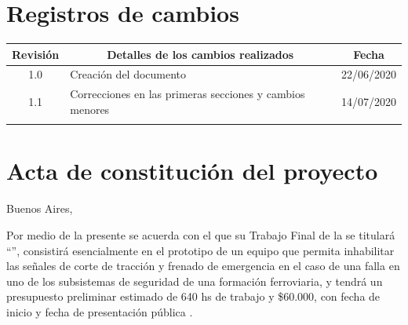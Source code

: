 \documentclass[11pt]{charter}
\begin{document}
\maketitle
\thispagestyle{empty}
\pagebreak


\thispagestyle{empty}
{\setlength{\parskip}{0pt}
\tableofcontents{}
}
\pagebreak


\section{Registros de cambios}
\label{sec:registro}


\begin{table}[ht]
\label{tab:registro}
\centering

\begin{tabularx}{\linewidth}{@{}|c|X|c|@{}}
\hline
\rowcolor[HTML]{C0C0C0} 
Revisión & \multicolumn{1}{c|}{\cellcolor[HTML]{C0C0C0}Detalles de los cambios realizados} & Fecha      \\ \hline
1.0      & Creación del documento                                                          & 22/06/2020 \\ \hline
1.1      & Correcciones en las primeras secciones y cambios menores                        & 14/07/2020 \\ \hline
         & & \\ \hline
\end{tabularx}
\end{table}

\pagebreak

\section{Acta de constitución del proyecto}
\label{sec:acta}

\begin{flushright}
Buenos Aires, \fechaInicioName
\end{flushright}

\vspace{2cm}

Por medio de la presente se acuerda con el \authorname\hspace{1px} que su Trabajo Final de la \degreename\hspace{1px} 
se titulará ``\ttitle'', consistirá esencialmente en el prototipo de un equipo que permita inhabilitar las señales de 
corte de tracción y frenado de emergencia en el caso de una falla en uno de los subsistemas de seguridad de una 
formación ferroviaria, y tendrá un presupuesto preliminar estimado de 640 hs de trabajo y \$60.000, con 
fecha de inicio \fechaInicioName\hspace{1px} y fecha de presentación pública \fechaFinalName.
\end{document}
